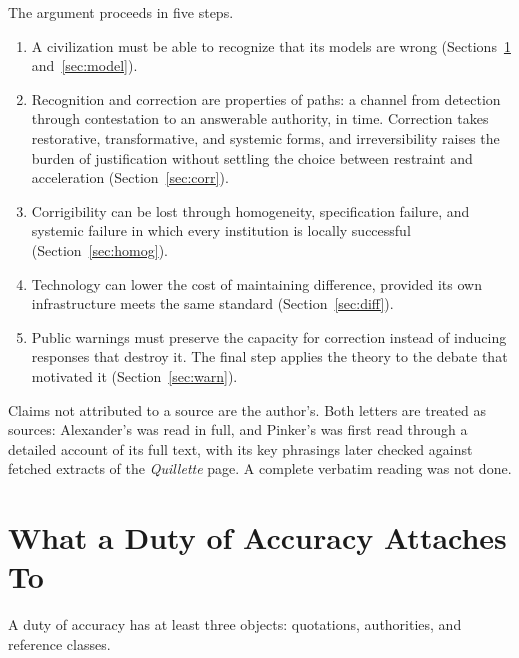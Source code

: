 \documentclass[11pt]{article}
\begin{document}
The argument proceeds in five steps.
\begin{enumerate}
\item A civilization must be able to recognize that its models are wrong (Sections~\ref{sec:accuracy} and~\ref{sec:model}).
\item Recognition and correction are properties of paths: a channel from detection through contestation to an answerable authority, in time. Correction takes restorative, transformative, and systemic forms, and irreversibility raises the burden of justification without settling the choice between restraint and acceleration (Section~\ref{sec:corr}).
\item Corrigibility can be lost through homogeneity, specification failure, and systemic failure in which every institution is locally successful (Section~\ref{sec:homog}).
\item Technology can lower the cost of maintaining difference, provided its own infrastructure meets the same standard (Section~\ref{sec:diff}).
\item Public warnings must preserve the capacity for correction instead of inducing responses that destroy it. The final step applies the theory to the debate that motivated it (Section~\ref{sec:warn}).
\end{enumerate}

Claims not attributed to a source are the author's. Both letters are treated as sources: Alexander's was read in full, and Pinker's was first read through a detailed account of its full text, with its key phrasings later checked against fetched extracts of the \emph{Quillette} page. A complete verbatim reading was not done.

\section{What a Duty of Accuracy Attaches To}\label{sec:accuracy}

A duty of accuracy has at least three objects: quotations, authorities, and reference classes.
\end{document}
